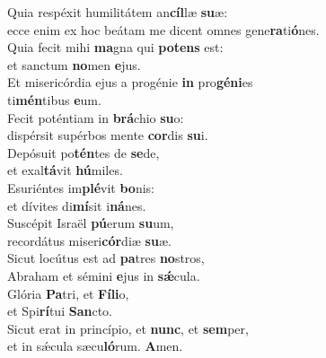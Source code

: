 \oddverse Quia respéxit humilitátem an\textbf{cíl}læ \textbf{su}æ:~\*\\
\oddverse ecce enim ex hoc beátam me dicent omnes gene\textbf{ra}ti\textbf{ó}nes.\\
\evenverse Quia fecit mihi \textbf{ma}gna qui \textbf{po}\textbf{tens} est:~\*\\
\evenverse et sanctum \textbf{no}men \textbf{e}jus.\\
\oddverse Et misericórdia ejus a progénie \textbf{in} pro\textbf{gé}\textbf{ni}es~\*\\
\oddverse ti\textbf{mén}tibus \textbf{e}um.\\
\evenverse Fecit poténtiam in \textbf{brá}chio \textbf{su}o:~\*\\
\evenverse dispérsit supérbos mente \textbf{cor}dis \textbf{su}i.\\
\oddverse Depósuit po\textbf{tén}tes de \textbf{se}de,~\*\\
\oddverse et exal\textbf{tá}vit \textbf{hú}miles.\\
\evenverse Esuriéntes im\textbf{plé}vit \textbf{bo}nis:~\*\\
\evenverse et dívites di\textbf{mí}sit i\textbf{ná}nes.\\
\oddverse Suscépit Israël \textbf{pú}erum \textbf{su}um,~\*\\
\oddverse recordátus miseri\textbf{cór}diæ \textbf{su}æ.\\
\evenverse Sicut locútus est ad \textbf{pa}tres \textbf{no}stros,~\*\\
\evenverse Abraham et sémini \textbf{e}jus in \textbf{sǽ}cula.\\
\oddverse Glória \textbf{Pa}tri, et \textbf{Fí}\textbf{li}o,~\*\\
\oddverse et Spi\textbf{rí}tui \textbf{San}cto.\\
\evenverse Sicut erat in princípio, et \textbf{nunc}, et \textbf{sem}per,~\*\\
\evenverse et in sǽcula sæcu\textbf{ló}rum. \textbf{A}men.\\

